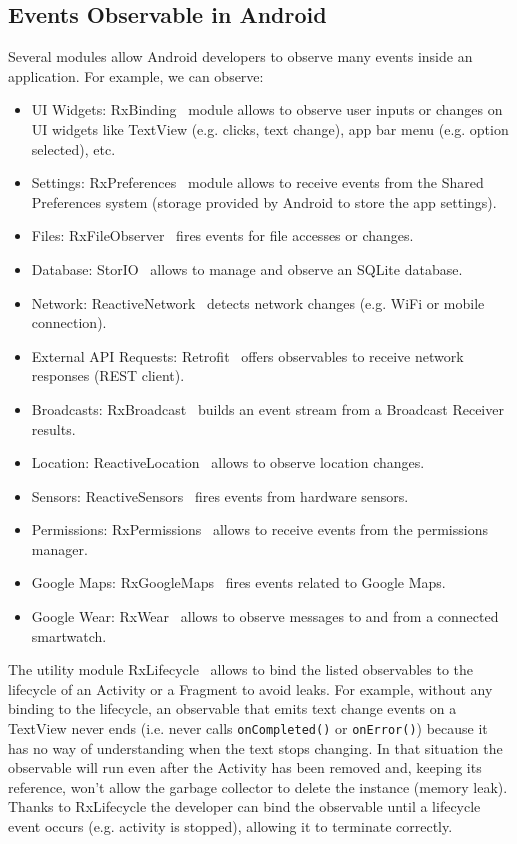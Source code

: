 \documentclass[11pt,a4paper,notitlepage]{article}
\begin{document}
\subsection{Events Observable in Android}\label{android_observables}
Several modules allow Android developers to observe many events inside an application. For example, we can observe:
\begin{itemize}
	\item UI Widgets: RxBinding~\cite{RxBinding} module allows to observe user inputs or changes on UI widgets like TextView (e.g. clicks, text change), app bar menu (e.g. option selected), etc.
	\item Settings: RxPreferences~\cite{RxPreferences} module allows to receive events from the Shared Preferences system (storage provided by Android to store the app settings).
	\item Files: RxFileObserver~\cite{RxFileObserver} fires events for file accesses or changes.
	\item Database: StorIO~\cite{StorIO} allows to manage and observe an SQLite database.
	\item Network: ReactiveNetwork~\cite{ReactiveNetwork} detects network changes (e.g. WiFi or mobile connection).
	\item External API Requests: Retrofit~\cite{Retrofit} offers observables to receive network responses (REST client).
	\item Broadcasts: RxBroadcast~\cite{RxBroadcast} builds an event stream from a Broadcast Receiver results.
	\item Location: ReactiveLocation~\cite{ReactiveLocation} allows to observe location changes.
	\item Sensors: ReactiveSensors~\cite{ReactiveSensors} fires events from hardware sensors.
	\item Permissions: RxPermissions~\cite{RxPermissions} allows to receive events from the permissions manager.
	\item Google Maps: RxGoogleMaps~\cite{RxGoogleMaps} fires events related to Google Maps.
	\item Google Wear: RxWear~\cite{RxWear} allows to observe messages to and from a connected smartwatch.
\end{itemize}\bigskip
The utility module RxLifecycle~\cite{RxLifecycle} allows to bind the listed observables to the lifecycle of an Activity or a Fragment to avoid leaks. For example, without any binding to the lifecycle, an observable that emits text change events on a TextView never ends (i.e. never calls \texttt{onCompleted()} or \texttt{onError()}) because it has no way of understanding when the text stops changing. In that situation the observable will run even after the Activity has been removed and, keeping its reference, won't allow the garbage collector to delete the instance (memory leak). Thanks to RxLifecycle the developer can bind the observable until a lifecycle event occurs (e.g. activity is stopped), allowing it to terminate correctly.
\end{document}
